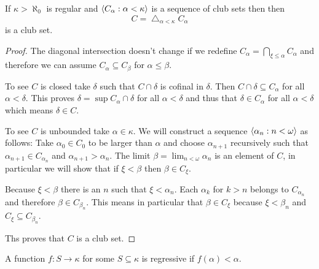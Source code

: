 \begin{proposition}
    If \(\kappa>\aleph_{0}\) is regular and
    \(\left<C_{\alpha}:\alpha<\kappa\right>\) is a sequence of club sets then
    then
    \[
        C=\bigtriangleup_{\alpha<\kappa}C_{\alpha}
    \]
    is a club set.

    \begin{proof}
        The diagonal intersection doesn't change if we redefine
        \(C_{\alpha}=\bigcap_{\xi\leq\alpha}C_{\alpha}\) and therefore we can
        assume \(C_{\alpha}\subseteq C_{\beta}\) for \(\alpha\leq\beta\).

        To see \(C\) is closed take \(\delta\) such that \(C\cap\delta\) is
        cofinal in \(\delta\). Then \(C\cap\delta\subseteq C_{\alpha}\) for all
        \(\alpha<\delta\). This proves \(\delta=\sup C_{\alpha}\cap\delta\) for
        all \(\alpha<\delta\) and thus that \(\delta\in C_{\alpha}\) for all
        \(\alpha<\delta\) which means \(\delta\in C\).

        To see \(C\) is unbounded take \(\alpha\in\kappa\). We will construct a
        sequence \(\left<\alpha_{n}:n<\omega\right>\) as follows: Take
        \(\alpha_{0}\in C_{0}\) to be larger than \(\alpha\) and choose
        \(\alpha_{n+1}\) recursively such that \(\alpha_{n+1}\in
        C_{\alpha_{n}}\) and \(\alpha_{n+1}>\alpha_{n}\). The limit
        \(\beta=\lim_{n<\omega}\alpha_{n}\) is an element of \(C\), in particular we
        will show that if \(\xi<\beta\) then \(\beta\in C_{\xi}\).

        Because \(\xi<\beta\) there is an \(n\) such that \(\xi<\alpha_{n}\).
        Each \(\alpha_{k}\) for \(k>n\) belongs to \(C_{\alpha_{n}}\) and
        therefore \(\beta\in C_{\beta_{n}}\). This means in particular that
        \(\beta\in C_{\xi}\) because \(\xi<\beta_{n}\) and \(C_{\xi}\subseteq
        C_{\beta_{n}}\).

        Ths proves that \(C\) is a club set.
    \end{proof}
\end{proposition}

\begin{definition}
    A function \(f:S\to\kappa\) for some \(S\subseteq\kappa\) is regressive
    if \(f(\alpha)<\alpha\).
\end{definition}


